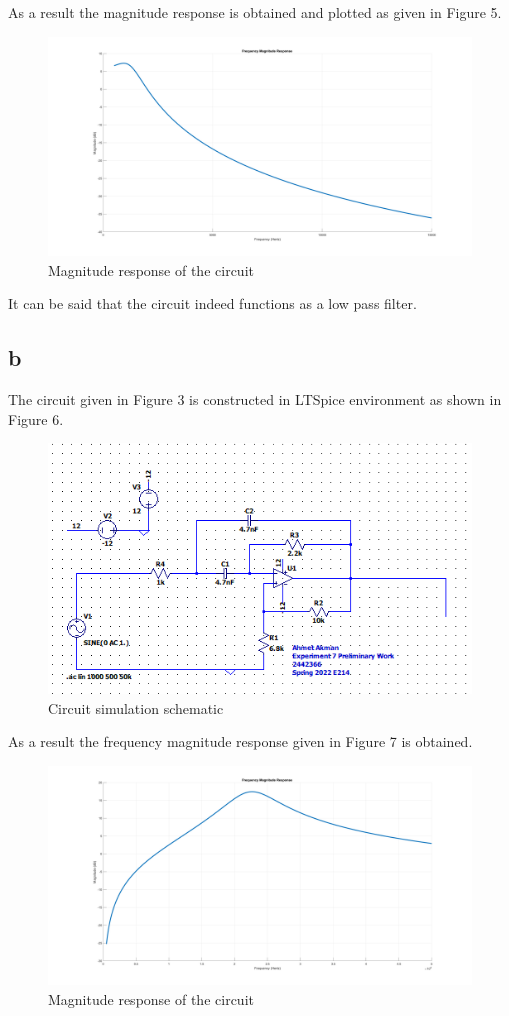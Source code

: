 \documentclass[letterpaper,12pt]{article}
\begin{document}
As a result the magnitude response is obtained and plotted as given in Figure 5.


\begin{figure}[H]
    \centering
    \includegraphics[width=1\textwidth]{1_1_1.png}
    \caption{Magnitude response of the circuit}
\end{figure}
It can be said that the circuit indeed functions as a low pass filter.
\subsection*{b} 
The circuit given in Figure 3 is constructed in LTSpice environment as shown in Figure 6.
\begin{figure}[H]
    \centering
    \includegraphics[width=1\textwidth]{fig3sim.png}
    \caption{Circuit simulation schematic }
\end{figure} 

As a result the frequency magnitude response given in Figure 7 is obtained.
\begin{figure}[H]
    \centering
    \includegraphics[width=1\textwidth]{2_1_1.png}
    \caption{Magnitude response of the circuit}
\end{figure} 
\end{document}
